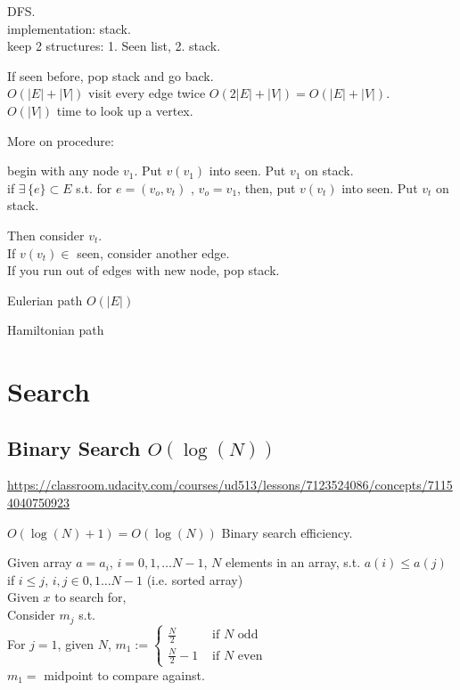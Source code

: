 \documentclass[10pt]{amsart}
\begin{document}
\begin{multicols*}{2}
DFS. \\
implementation: stack. \\
keep 2 structures: 1. Seen list, 2. stack. 

If seen before, pop stack and go back. \\
$O(|E| + |V|)$ visit every edge twice $O(2|E| + |V|) = O(|E| + |V|)$. \\
$O(|V|)$ time to look up a vertex. 

More on procedure:

begin with any node $v_1$. Put $v(v_1)$ into seen. Put $v_1$ on stack. \\
if $\exists \, \lbrace e \rbrace \subset E$ s.t. for $e = (v_o, v_t)$ , $v_o = v_1$, then, put $v(v_t)$ into seen. Put $v_t$ on stack.

Then consider $v_t$. \\
If $v(v_t) \in $ seen, consider another edge. \\
If you run out of edges with new node, pop stack. 

Eulerian path $O(|E|) $ 

Hamiltonian path




\section{Search}

\subsection{Binary Search $O(\log{(N)})$}

\url{https://classroom.udacity.com/courses/ud513/lessons/7123524086/concepts/71154040750923}

$O(\log{(N)} + 1) = O(\log{(N)})$ Binary search efficiency.

Given array $a=a_i$, $i=0,1,\dots N-1$, $N$ elements in an array, s.t. $a(i) \leq a(j)$ if $i\leq j$, $i,j \in 0, 1\dots N-1$ (i.e. sorted array) \\
Given $x$ to search for, \\
Consider $m_j$ s.t. \\
For $j=1$, given $N$, $m_1 := \begin{cases} \frac{N}{2} & \text{ if $N$ odd } \\
\frac{N}{2} -1 & \text{ if $N$ even } \end{cases} $ \\

$m_1=$ midpoint to compare against. \\


\end{multicols*}
\end{document}
